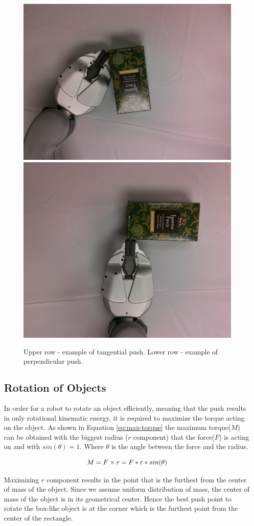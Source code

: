 \begin{figure}
\centering 

\includegraphics[width=0.4\columnwidth]{figures/peets-tangential.jpg}\\
\includegraphics[width=0.4\columnwidth]{figures/peets-perpendicular.jpg}\\


\caption{Upper row - example of tangential push. Lower row - example of perpendicular push.}
\label{fig:tangential-example}
\end{figure}


\subsection{Rotation of Objects}
In order for a robot to rotate an object efficiently, meaning that the push results in only rotational kinematic energy, it is required to maximize the torque acting on the object. As shown in Equation \ref{eq:max-torque} the maximum torque($M$) can be obtained with the biggest radius ($r$ component) that the force($F$) is acting on and with $sin(\theta) = 1$. Where $\theta$ is the angle between the force and the radius.

\begin{equation}
M =  F \times r = F*r*sin(\theta)\\
\label{eq:max-torque}
\end{equation}

Maximizing $r$ component results in the point that is the furthest from the center of mass of the object. Since we assume uniform distribution of mass, the center of mass of the object is in its geometrical center. Hence the best push point to rotate the box-like object is at the corner which is the furthest point from the center of the rectangle.

